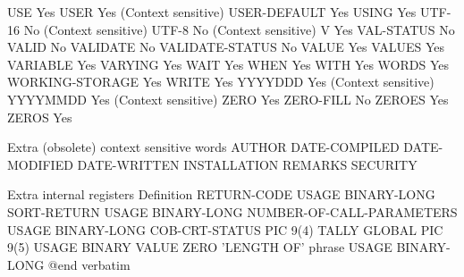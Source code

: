 USE                             Yes
USER                            Yes (Context sensitive)
USER-DEFAULT                    Yes
USING                           Yes
UTF-16                          No (Context sensitive)
UTF-8                           No (Context sensitive)
V                               Yes
VAL-STATUS                      No
VALID                           No
VALIDATE                        No
VALIDATE-STATUS                 No
VALUE                           Yes
VALUES                          Yes
VARIABLE                        Yes
VARYING                         Yes
WAIT                            Yes
WHEN                            Yes
WITH                            Yes
WORDS                           Yes
WORKING-STORAGE                 Yes
WRITE                           Yes
YYYYDDD                         Yes (Context sensitive)
YYYYMMDD                        Yes (Context sensitive)
ZERO                            Yes
ZERO-FILL                       No
ZEROES                          Yes
ZEROS                           Yes

Extra (obsolete) context sensitive words
AUTHOR
DATE-COMPILED
DATE-MODIFIED
DATE-WRITTEN
INSTALLATION
REMARKS
SECURITY

Extra internal registers        Definition
RETURN-CODE                     USAGE BINARY-LONG
SORT-RETURN                     USAGE BINARY-LONG
NUMBER-OF-CALL-PARAMETERS       USAGE BINARY-LONG
COB-CRT-STATUS                  PIC 9(4)
TALLY                           GLOBAL PIC 9(5) USAGE BINARY VALUE ZERO
'LENGTH OF' phrase              USAGE BINARY-LONG
@end verbatim

